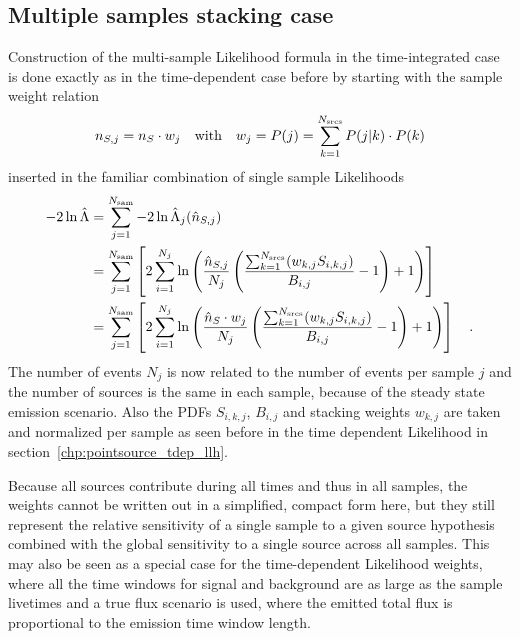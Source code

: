 \subsection{Multiple samples stacking case}
  \label{equ:multi_sam_time_indep}
Construction of the multi-sample Likelihood formula in the time-integrated case is done exactly as in the time-dependent case before by starting with the sample weight relation
\begin{equation}
  n_{S,j} = n_S \cdot w_j
  \quad\text{with}\quad
  w_j = P(j) = \sum_{k=1}^{N_\text{srcs}} P(j|k)\cdot P(k)
\end{equation}
inserted in the familiar combination of single sample Likelihoods
\begin{align}
  -2\ln\hat{\Lambda}
  &= \sum_{j=1}^{N_\text{sam}} -2\ln\hat{\Lambda}_j(\hat{n}_{S,j}) \\
  &= \sum_{j=1}^{N_\text{sam}} \left[
      2\sum_{i=1}^{N_j} \ln\left(
        \frac{\hat{n}_{S,j}}{N_j}\left(
          \frac{\sum_{k=1}^{N_\text{srcs}}(w_{k,j} S_{i,k,j})}{B_{i,j}} - 1
        \right) + 1
      \right)
    \right] \\
  &= \sum_{j=1}^{N_\text{sam}} \left[
      2\sum_{i=1}^{N_j} \ln\left(
        \frac{\hat{n}_S \cdot w_j}{N_j}\left(
          \frac{\sum_{k=1}^{N_\text{srcs}}(w_{k,j} S_{i,k,j})}{B_{i,j}} - 1
        \right) + 1
      \right)
    \right]
  \quad\text{.}
\end{align}
The number of events $N_j$ is now related to the number of events per sample $j$ and the number of sources is the same in each sample, because of the steady state emission scenario.
Also the PDFs $S_{i,k,j}$, $B_{i,j}$ and stacking weights $w_{k,j}$ are taken and normalized per sample as seen before in the time dependent Likelihood in section~\ref{chp:pointsource_tdep_llh}.

Because all sources contribute during all times and thus in all samples, the weights cannot be written out in a simplified, compact form here, but they still represent the relative sensitivity of a single sample to a given source hypothesis combined with the global sensitivity to a single source across all samples.
This may also be seen as a special case for the time-dependent Likelihood weights, where all the time windows for signal and background are as large as the sample livetimes and a true flux scenario is used, where the emitted total flux is proportional to the emission time window length.

